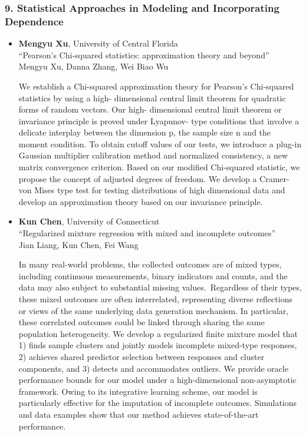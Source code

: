 \subsubsection*{9. Statistical Approaches in Modeling and Incorporating Dependence}

\begin{itemize}
\item \textbf{Mengyu Xu}, University of Central Florida \\
``Pearson's Chi-squared statistics: approximation theory and beyond'' \\
Mengyu Xu, Danna Zhang, Wei Biao Wu


We establish a Chi-squared approximation theory for Pearson's Chi-squared statistics by using a high-
dimensional central limit theorem for quadratic forms of random vectors. Our high-
dimensional central limit theorem or invariance principle is proved under Lyapunov-
type conditions that involve a delicate interplay between the dimension p, the sample
size n and the moment condition. To obtain cutoff values of our tests, we introduce a plug-in Gaussian multiplier calibration method and normalized consistency, a new matrix convergence criterion. Based on our modified Chi-squared statistic, we propose the concept of adjusted degrees of freedom. We develop a Cramer-von Mises type test for testing distributions of high dimensional data and develop an approximation theory based on our invariance principle.

\item \textbf{Kun Chen}, University of Connecticut \\
``Regularized mixture regression with mixed and incomplete outcomes'' \\
Jian Liang, Kun Chen, Fei Wang


In many real-world problems, the collected outcomes are of mixed types, including continuous measurements, binary indicators and counts, and the data may also subject to substantial missing values. Regardless of their types, these mixed outcomes are often interrelated, representing diverse reflections or views of the same underlying data generation mechanism. In particular, these correlated outcomes could be linked through sharing the same population heterogeneity. We develop a regularized finite mixture model that 1) finds sample clusters and jointly models incomplete mixed-type responses, 2) achieves shared predictor selection between responses and cluster components, and 3) detects and accommodates outliers. We provide oracle performance bounds for our model under a high-dimensional non-asymptotic framework. Owing to its integrative learning scheme, our model is particularly effective for the imputation of incomplete outcomes. Simulations and data examples show that our method achieves state-of-the-art performance.


\end{itemize}
